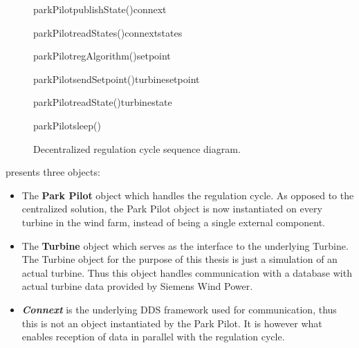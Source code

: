 \begin{figure}[!h]
	\centering
	\begin{sequencediagram} %
		
		\begin {messcall}{parkPilot}{publishState()}{connext}{}
		\end {messcall}
		\begin {call}{parkPilot}{readStates()}{connext}{states}
		\end {call}
		\begin {callself}{parkPilot}{regAlgorithm()}{setpoint}
		\end {callself}
		\begin {call}{parkPilot}{sendSetpoint()}{turbine}{setpoint}
		\end {call}
		\begin {call}{parkPilot}{readState()}{turbine}{state}
		\end {call}	
		\begin {callself}{parkPilot}{sleep()}{}
		\end {callself}			
	\end{sequencediagram}

	\caption[Decentralized regulation cycle sequence diagram]{
		\label{fig:decenRegCycle} 
		\footnotesize{%
			Decentralized regulation cycle sequence diagram.
		}
	}
\end{figure}

 presents three objects:

\begin{itemize}
	\item The \textbf{Park Pilot} object which handles the regulation cycle. As opposed to the centralized solution, the Park Pilot object is now instantiated on every turbine in the wind farm, instead of being a single external component.
	\item The \textbf{Turbine} object which serves as the interface to the underlying Turbine. The Turbine object for the purpose of this thesis is just a simulation of an actual turbine. Thus this object handles communication with a database with actual turbine data provided by Siemens Wind Power.
	\item \textbf{\textit{Connext}} is the underlying DDS framework used for communication, thus this is not an object instantiated by the Park Pilot. It is however what enables reception of data in parallel with the regulation cycle. 
\end{itemize}


